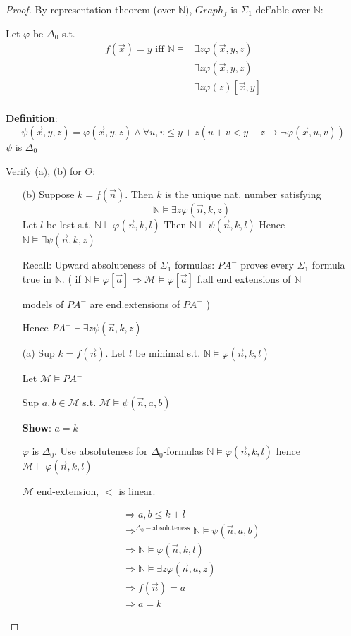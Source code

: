 \documentclass[12pt]{article}
\newcommand{\Nat}{\ensuremath{\mathbb{N}}}
\newcommand{\proves}{\vdash}
\newcommand{\defn}{\textbf{Definition}: }
\begin{document}
\begin{proof}
 By representation theorem (over $\Nat$), $Graph_f$ is
$\Sigma_1$-def'able over $\Nat$:

Let $\varphi$ be $\Delta_0$ s.t.
\begin{align*}
  f(\vec{x}) = y \text{ iff } \Nat \models &\exists z \varphi(\vec{x},y,z) \\
  &\exists z \varphi( \vec{x} , y ,z) \\ %
  &\exists z \varphi(z) [\vec{x}, y] \\
\end{align*}

\defn \[
\psi(\vec{x}, y, z) = \varphi(\vec{x}, y, z) \wedge \forall u, v \le y+z
( u+v < y + z \rightarrow \neg\varphi(\vec{x}, u, v) )
\]
$\psi$ is $\Delta_0$

Verify (a), (b) for $\Theta$:

\begin{enumerate}
  \item[(b)]
    Suppose $k=f(\vec{n})$. Then $k$ is the unique nat. number satisfying
    \[ \Nat \models \exists z \varphi(\vec{n}, k, z) 
    \]
    Let $l$ be lest s.t. $\Nat \models \varphi(\vec{n}, k, l)$
    Then $\Nat \models \psi(\vec{n},k,l)$
    Hence $\Nat \models \exists \psi(\vec{n},k,z)$

Recall: Upward absoluteness of $\Sigma_1$ formulas:
$PA^-$ proves every $\Sigma_1$ formula true in $\Nat$.
(
if $\Nat \models \varphi[\vec{a}] \Rightarrow 
\mathcal{M} \models \varphi[\vec{a}]$ f.all end extensions of $\Nat$

models of $PA^-$ are end.extensions of $PA^-$
)

Hence $PA^- \proves \exists z \psi(\vec{n},k,z)$

\item[(a)]
  Sup $k = f(\vec{n})$.
  Let $l$ be minimal s.t. 
  $\Nat \models \varphi(\vec{n},k,l)$

  Let $\mathcal{M} \models PA^-$

  Sup $a,b \in \mathcal{M}$ s.t. $\mathcal{M} \models \psi(\vec{n},a,b)$

  \textbf{Show}: $a = k$

  $\varphi$ is $\Delta_0$.  Use absoluteness for $\Delta_0$-formulas
  $\Nat \models \varphi(\vec{n},k,l)$ hence $\mathcal{M} \models \varphi(\vec{n},k,l)$

  $\mathcal{M}$ end-extension, $<$ is linear.
  
\begin{align*}
  \Rightarrow a,b \le k+l \\
  \Rightarrow^{\Delta_0-\text{absoluteness}} 
  \Nat \models \psi(\vec{n},a,b) \\
  \Rightarrow \Nat \models \varphi(\vec{n},k,l) \\
  \Rightarrow \Nat \models \exists z \varphi(\vec{n},a,z) \\
  \Rightarrow f(\vec{n}) = a \\
  \Rightarrow a = k
\end{align*}
\end{enumerate}
\end{proof}
\end{document}
